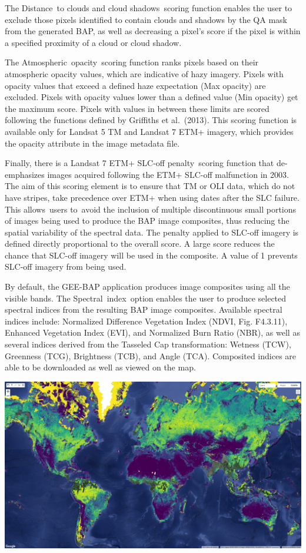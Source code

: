 \documentclass[
  letterpaper,
  DIV=11,
  numbers=noendperiod]{scrreprt}
\begin{document}
The Distance~to clouds and cloud shadows~scoring function enables the
user to exclude those pixels identified to contain clouds and shadows by
the QA mask from the generated BAP, as well as decreasing a pixel's
score if the pixel is within a specified proximity of a cloud or cloud
shadow.

The Atmospheric~opacity~scoring function ranks pixels based on their
atmospheric opacity values, which are indicative of hazy imagery. Pixels
with opacity values that exceed a defined haze expectation (Max opacity)
are excluded. Pixels with opacity values lower than a defined value (Min
opacity) get the maximum score. Pixels with values in between these
limits are scored following the functions defined by Griffiths et
al.~(2013). This scoring function is available only for Landsat 5 TM and
Landsat 7 ETM+ imagery, which provides the opacity attribute in the
image metadata file.

Finally, there is a Landsat 7 ETM+ SLC-off penalty~scoring function that
de-emphasizes images acquired following the ETM+ SLC-off malfunction in
2003. The aim of this scoring element is to ensure that TM or OLI data,
which do not have stripes, take precedence over ETM+ when using dates
after the SLC failure. This allows~users to~avoid the inclusion of
multiple discontinuous small portions of images being used to produce
the BAP image composites, thus reducing the spatial variability of the
spectral data. The penalty applied to SLC-off imagery is defined
directly proportional to the overall score. A large score reduces the
chance that SLC-off imagery will be used in the composite. A value of 1
prevents SLC-off imagery from being used.

By default, the GEE-BAP application produces image composites using all
the visible bands. The Spectral~index~option enables the user to produce
selected spectral indices from the resulting BAP image composites.
Available spectral indices include: Normalized Difference Vegetation
Index (NDVI, Fig. F4.3.11), Enhanced Vegetation Index (EVI), and
Normalized Burn Ratio (NBR), as well as several indices derived from the
Tasseled Cap transformation: Wetness (TCW), Greenness (TCG), Brightness
(TCB), and Angle (TCA). Composited indices are able to be downloaded as
well as viewed on the map.

\includegraphics{./F4/image60.png}
\end{document}
